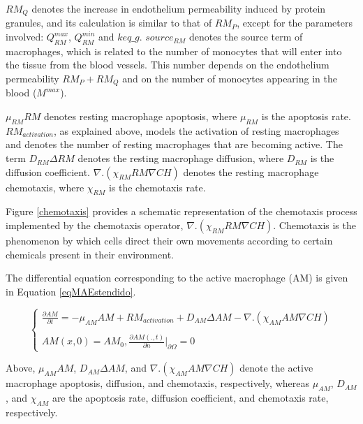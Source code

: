 \documentclass[10pt]{bmc_article}
\newenvironment{bmcformat}{\baselineskip20pt\sloppy\setboolean{publ}{false}}{\baselineskip20pt\sloppy}
\begin{document}
\begin{bmcformat}
$RM_{Q}$ denotes the increase in endothelium permeability induced by protein granules, and its calculation is similar to that of $RM_{P}$, 
except for the parameters involved: $Q^{max}_{RM}$, $Q^{min}_{RM}$ and $keq\_g$. $source_{RM}$ denotes the source term of macrophages, 
which is related to the number of monocytes that will enter into the tissue from the blood vessels. 
This number depends on the endothelium permeability $RM_{P} + RM_{Q}$ and on the number of monocytes appearing in the blood ($M^{max}$).
 
$\mu_{RM} RM$ denotes resting macrophage apoptosis, where $\mu_{RM}$ is the apoptosis rate. $RM_{activation}$, as explained above, models 
the activation of resting macrophages and denotes the number of resting macrophages that are becoming active. The term $D_{RM} \Delta RM$ 
denotes the resting macrophage diffusion, where $D_{RM}$ is the diffusion coefficient. $\nabla. (\chi_{RM} RM \nabla CH)$ denotes the 
resting macrophage chemotaxis, where $\chi_{RM}$ is the chemotaxis rate.

Figure \ref{chemotaxis} provides a schematic representation of the chemotaxis process implemented by the chemotaxis operator,  
$\nabla. (\chi_{RM} RM \nabla CH)$. Chemotaxis is the phenomenon by which cells direct their own movements according to certain chemicals 
present in their environment.


The differential equation corresponding to the active macrophage (AM) is given in Equation \ref{eqMAEstendido}.

\begin{equation}
\label{eqMAEstendido}
 \begin{cases} 
\frac{\partial AM}{\partial t} = -\mu_{AM} AM + RM_{activation} + D_{AM} \Delta AM - \nabla. (\chi_{AM} AM \nabla CH)\\\\
AM(x,0) = AM_0, \frac{\partial AM(.,t)}{\partial n} |_{\partial\Omega} = 0 
\end{cases}
\end{equation}


Above, $\mu_{AM} AM$, $D_{AM} \Delta AM$, and $\nabla. (\chi_{AM} AM \nabla CH)$ denote the active macrophage apoptosis, diffusion, 
and chemotaxis, respectively, whereas $\mu_{AM}$, $D_{AM}$, and $\chi_{AM}$ are the apoptosis rate, diffusion coefficient, and chemotaxis 
rate, respectively.


\end{bmcformat}
\end{document}
